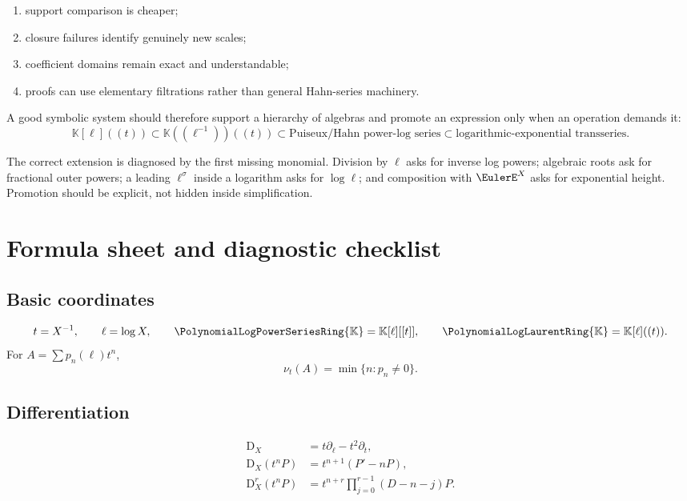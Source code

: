 \documentclass[11pt,oneside,openany]{book}
\newcommand{\K}{\mathbb{K}}
\newcommand{\Rring}{\PolynomialLogPowerSeriesRing{\K}}
\newcommand{\Pring}{\PolynomialLogLaurentRing{\K}}
\newcommand{\ordt}{\nu_t}
\newcommand{\D}{\mathrm{D}}
\begin{document}
\begin{enumerate}
\item support comparison is cheaper;
\item closure failures identify genuinely new scales;
\item coefficient domains remain exact and understandable;
\item proofs can use elementary filtrations rather than general Hahn-series
machinery.
\end{enumerate}

A good symbolic system should therefore support a hierarchy of algebras and
promote an expression only when an operation demands it:
\[
 \K[\ell]((t))
 \subset
 \K((\ell^{-1}))((t))
 \subset
 \text{Puiseux/Hahn power-log series}
 \subset
 \text{logarithmic-exponential transseries}.
\]

\begin{summarybox}
The correct extension is diagnosed by the first missing monomial.  Division by
\(\ell\) asks for inverse log powers; algebraic roots ask for fractional outer
powers; a leading \(\ell^\sigma\) inside a logarithm asks for \(\log\ell\); and
composition with \(\EulerE^X\) asks for exponential height.  Promotion should be
explicit, not hidden inside simplification.
\end{summarybox}

\chapter{Formula sheet and diagnostic checklist}
\label{ch:formulasheet}

\section{Basic coordinates}
\begin{equation}\label{eq:sheetcoordinates}
 t=X^{-1},
 \qquad
 \ell=\log X,
 \qquad
 \Rring=\K[\ell][[t]],
 \qquad
 \Pring=\K[\ell]((t)).
\end{equation}
For
\(A=\sum p_n(\ell)t^n\),
\[
 \ordt(A)=\min\{n:p_n\neq0\}.
\]

\section{Differentiation}
\begin{align}
 \D_X&=t\partial_\ell-t^2\partial_t,
 \label{eq:sheetD}\\
 \D_X(t^nP)&=t^{n+1}(P'-nP),
 \label{eq:sheetDblock}\\
 \D_X^r(t^nP)&=t^{n+r}
 \prod_{j=0}^{r-1}(D-n-j)P.
 \label{eq:sheetDrepeat}
\end{align}
\end{document}
